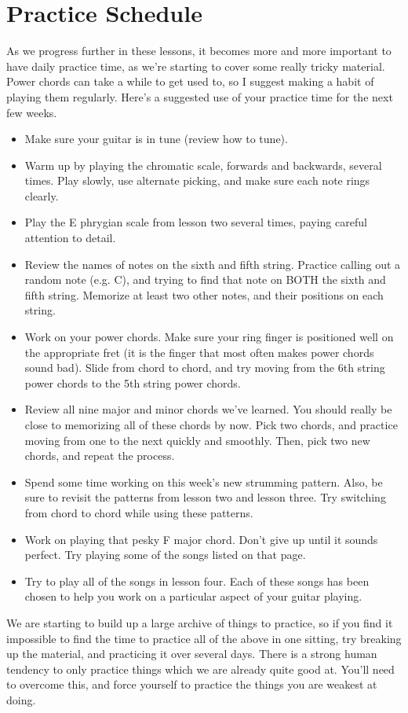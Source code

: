 \section{Practice Schedule}
As we progress further in these lessons, it becomes more and more important to
have daily practice time, as we're starting to cover some really tricky
material. Power chords can take a while to get used to, so I suggest making a
habit of playing them regularly. Here's a suggested use of your practice time
for the next few weeks.
%
\begin{itemize}
\item Make sure your guitar is in tune (review how to tune).
\item Warm up by playing the chromatic scale, forwards and backwards, several
      times. Play slowly, use alternate picking, and make sure each note rings
      clearly.
\item Play the E phrygian scale from lesson two several times, paying careful
      attention to detail.
\item Review the names of notes on the sixth and fifth string. Practice calling
      out a random note (e.g. C), and trying to find that note on BOTH the sixth and
      fifth string. Memorize at least two other notes, and their positions on each
      string.
\item Work on your power chords. Make sure your ring finger is positioned well
      on the appropriate fret (it is the finger that most often makes power chords
      sound bad). Slide from chord to chord, and try moving from the 6th string power
      chords to the 5th string power chords.
\item Review all nine major and minor chords we've learned. You should really
      be close to memorizing all of these chords by now. Pick two chords, and
      practice moving from one to the next quickly and smoothly. Then, pick two new
      chords, and repeat the process.
\item Spend some time working on this week's new strumming pattern. Also, be
      sure to revisit the patterns from lesson two and lesson three. Try switching
      from chord to chord while using these patterns.
\item Work on playing that pesky F major chord. Don't give up until it sounds
      perfect. Try playing some of the songs listed on that page.
\item Try to play all of the songs in lesson four. Each of these songs has been
      chosen to help you work on a particular aspect of your guitar playing.
\end{itemize}
%
We are starting to build up a large archive of things to practice, so if you
find it impossible to find the time to practice all of the above in one
sitting, try breaking up the material, and practicing it over several days.
There is a strong human tendency to only practice things which we are already
quite good at. You'll need to overcome this, and force yourself to practice the
things you are weakest at doing.

